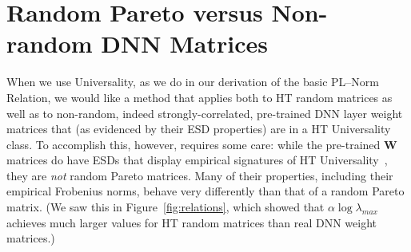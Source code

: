 

\section{Random Pareto versus Non-random DNN Matrices} 
\label{sxn:appendix-universality}

When we use Universality, as we do in our derivation of the basic PL--Norm Relation, we would like a method that applies both to HT random matrices as well as to non-random, indeed strongly-correlated, pre-trained DNN layer weight matrices that (as evidenced by their ESD properties) are in a HT Universality class.  
To accomplish this, however, requires some care: while the pre-trained $\mathbf{W}$ matrices do have ESDs that display empirical signatures of HT Universality~\cite{MM18_TR}, they are \emph{not} random Pareto matrices.
Many of their properties, including their empirical Frobenius norms, behave very differently than that of a random Pareto matrix.  
(We saw this in Figure~\ref{fig:relations}, which showed that $ \alpha\log\lambda_{max} $ achieves much larger values for HT random matrices than real DNN weight matrices.)

